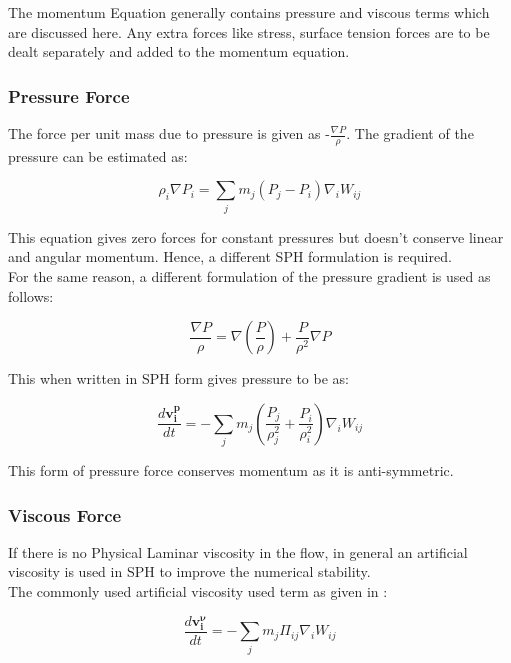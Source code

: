 The momentum Equation generally contains pressure and viscous terms which are discussed here.
Any extra forces like stress, surface tension forces are to be dealt
separately and added to the momentum equation.

\subsubsection{Pressure Force}

The force per unit mass due to pressure is given as -$\frac{\nabla P}{\rho}$.
The gradient of the pressure can be estimated as:

\begin{equation}
 \rho_i \nabla P_i = \sum_j m_j (P_j - P_i) \nabla_i W_{ij}
\end{equation}

This equation gives zero forces for constant pressures but doesn't
conserve linear and angular momentum. Hence, a different SPH formulation
is required.\\

For the same reason, a different formulation of the pressure gradient is used as follows:

\begin{equation}
 \frac{\nabla P}{\rho} = \nabla \left( \frac{P}{\rho}\right) + \frac{P}{\rho^2}\nabla P
\end{equation}

This when written in SPH form gives pressure to be as:

\begin{equation}
 \frac{d\mathbf{v_i^p}}{dt} = -\sum_j m_j \left( \frac{P_j}{\rho_j^2} + \frac{P_i}{\rho_i^2}\right)\nabla_i W_{ij}
\end{equation}

\noindent
This form of pressure force conserves momentum as it is anti-symmetric. 

\subsubsection{Viscous Force}

If there is no Physical Laminar viscosity in the flow, in general
an artificial viscosity is used in SPH to improve the numerical stability.\\

The commonly used artificial viscosity used term as given in \citep{Monaghan1983}:

\begin{equation}
 \frac{d\mathbf{v_i^\nu}}{dt} = - \sum_j m_j \Pi_{ij} \nabla_i W_{ij}
\end{equation}

